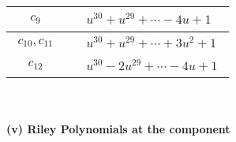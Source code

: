 \documentclass[1p]{elsarticle_modified}
\theoremstyle{definition}
\begin{document}
\begin{tabular}{m{50pt}|m{274pt}}
\hline $$\begin{aligned}c_{9}\end{aligned}$$&$\begin{aligned}
&u^{30}+u^{29}+\cdots-4 u+1
\end{aligned}$\\
\hline $$\begin{aligned}c_{10},c_{11}\end{aligned}$$&$\begin{aligned}
&u^{30}+u^{29}+\cdots+3 u^2+1
\end{aligned}$\\
\hline $$\begin{aligned}c_{12}\end{aligned}$$&$\begin{aligned}
&u^{30}-2 u^{29}+\cdots-4 u+1
\end{aligned}$\\
\hline
\end{tabular}\\~\\
\newpage\renewcommand{\arraystretch}{1}
\flushleft \textbf{(v) Riley Polynomials at the component}\newline \\
\end{document}
